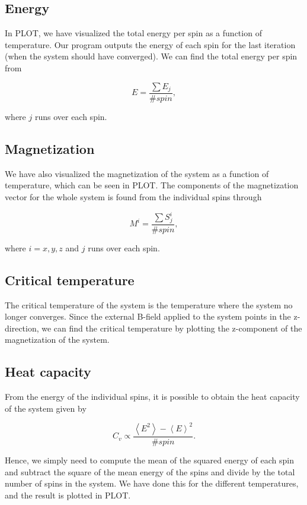 \documentclass{article}
\begin{document}
\subsection{Energy}
In PLOT, we have visualized the total energy per spin as a function of temperature. Our program outputs the energy of each spin for the last iteration (when the system should have converged). We can find the total energy per spin from

\begin{equation}
    E = \frac{\sum{E_{j}}}{\#spin},
\end{equation}

where $j$ runs over each spin.

\subsection{Magnetization}
We have also visualized the magnetization of the system as a function of temperature, which can be seen in PLOT. The components of the magnetization vector for the whole system is found from the individual spins through

\begin{equation}
    M^{i} = \frac{\sum{S_j^{i}}}{\#spin},
\end{equation}

where $i=x,y,z$ and $j$ runs over each spin.

\subsection{Critical temperature}
The critical temperature of the system is the temperature where the system no longer converges. Since the external B-field applied to the system points in the z-direction, we can find the critical temperature by plotting the z-component of the magnetization of the system.

\subsection{Heat capacity}
From the energy of the individual spins, it is possible to obtain the heat capacity of the system given by

\begin{equation}
    C_v \propto \frac{\left< E^2 \right> - \left< E \right>^2}{\#spin}.
\end{equation}

Hence, we simply need to compute the mean of the squared energy of each spin and subtract the square of the mean energy of the spins and divide by the total number of spins in the system. We have done this for the different temperatures, and the result is plotted in PLOT.
\end{document}
